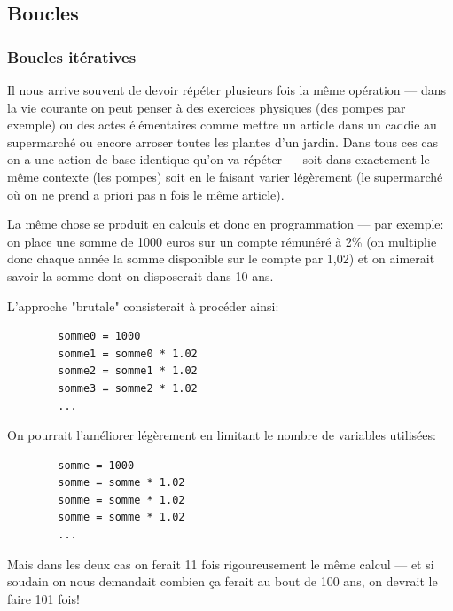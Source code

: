 \documentclass[12pt]{article}
\begin{document}
	\noindent
	
	\subsection{Boucles}
	\subsubsection*{Boucles itératives}
	Il nous arrive souvent de devoir répéter plusieurs fois la même opération --- dans la vie courante on peut penser à des exercices physiques (des pompes par exemple) ou des actes élémentaires comme mettre un article dans un caddie au supermarché ou encore arroser toutes les plantes d'un jardin. Dans tous ces cas on a une action de base identique qu'on va répéter --- soit dans exactement le même contexte (les pompes) soit en le faisant varier légèrement (le supermarché où on ne prend a priori pas n fois le même article).
	
	La même chose se produit en calculs et donc en programmation --- par exemple: on place une somme de 1000 euros sur un compte rémunéré à 2\% (on multiplie donc chaque année la somme disponible sur le compte par 1,02) et on aimerait savoir la somme dont on disposerait dans 10 ans.
	
	L'approche "brutale" consisterait à procéder ainsi:
	\begin{verbatim}
		somme0 = 1000
		somme1 = somme0 * 1.02
		somme2 = somme1 * 1.02
		somme3 = somme2 * 1.02
		...
	\end{verbatim}
	On pourrait l'améliorer légèrement en limitant le nombre de variables utilisées:
	\begin{verbatim}
		somme = 1000
		somme = somme * 1.02
		somme = somme * 1.02
		somme = somme * 1.02
		...
	\end{verbatim}
	Mais dans les deux cas on ferait 11 fois rigoureusement le même calcul --- et si soudain on nous demandait combien ça ferait au bout de 100 ans, on devrait le faire 101 fois!
	
\end{document}
